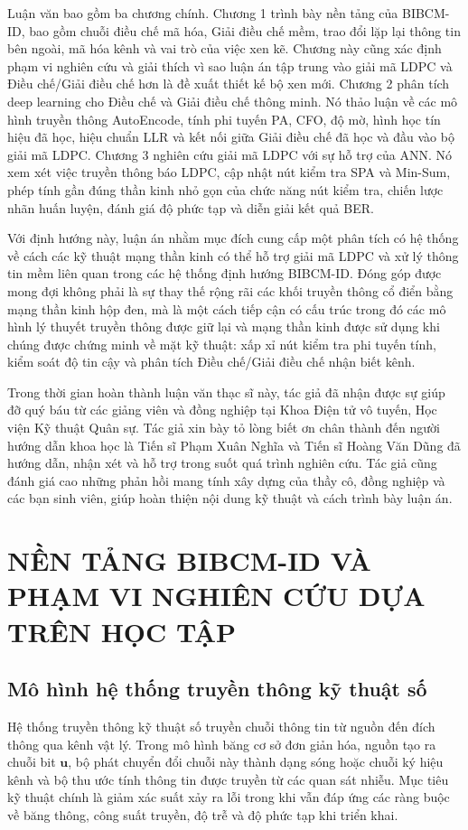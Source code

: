 Luận văn bao gồm ba chương chính. Chương 1 trình bày nền tảng của BIBCM-ID, bao gồm chuỗi điều chế mã hóa, Giải điều chế mềm, trao đổi lặp lại thông tin bên ngoài, mã hóa kênh và vai trò của việc xen kẽ. Chương này cũng xác định phạm vi nghiên cứu và giải thích vì sao luận án tập trung vào giải mã LDPC và Điều chế/Giải điều chế hơn là đề xuất thiết kế bộ xen mới. Chương 2 phân tích deep learning cho Điều chế và Giải điều chế thông minh. Nó thảo luận về các mô hình truyền thông AutoEncode, tính phi tuyến PA, CFO, độ mờ, hình học tín hiệu đã học, hiệu chuẩn LLR và kết nối giữa Giải điều chế đã học và đầu vào bộ giải mã LDPC. Chương 3 nghiên cứu giải mã LDPC với sự hỗ trợ của ANN. Nó xem xét việc truyền thông báo LDPC, cập nhật nút kiểm tra SPA và Min-Sum, phép tính gần đúng thần kinh nhỏ gọn của chức năng nút kiểm tra, chiến lược nhãn huấn luyện, đánh giá độ phức tạp và diễn giải kết quả BER.

Với định hướng này, luận án nhằm mục đích cung cấp một phân tích có hệ thống về cách các kỹ thuật mạng thần kinh có thể hỗ trợ giải mã LDPC và xử lý thông tin mềm liên quan trong các hệ thống định hướng BIBCM-ID. Đóng góp được mong đợi không phải là sự thay thế rộng rãi các khối truyền thông cổ điển bằng mạng thần kinh hộp đen, mà là một cách tiếp cận có cấu trúc trong đó các mô hình lý thuyết truyền thông được giữ lại và mạng thần kinh được sử dụng khi chúng được chứng minh về mặt kỹ thuật: xấp xỉ nút kiểm tra phi tuyến tính, kiểm soát độ tin cậy và phân tích Điều chế/Giải điều chế nhận biết kênh.

Trong thời gian hoàn thành luận văn thạc sĩ này, tác giả đã nhận được sự giúp đỡ quý báu từ các giảng viên và đồng nghiệp tại Khoa Điện tử vô tuyến, Học viện Kỹ thuật Quân sự. Tác giả xin bày tỏ lòng biết ơn chân thành đến người hướng dẫn khoa học là Tiến sĩ Phạm Xuân Nghĩa và Tiến sĩ Hoàng Văn Dũng đã hướng dẫn, nhận xét và hỗ trợ trong suốt quá trình nghiên cứu. Tác giả cũng đánh giá cao những phản hồi mang tính xây dựng của thầy cô, đồng nghiệp và các bạn sinh viên, giúp hoàn thiện nội dung kỹ thuật và cách trình bày luận án.

\chapter[\textbf{NỀN TẢNG BIBCM-ID VÀ PHẠM VI NGHIÊN CỨU}]{NỀN TẢNG BIBCM-ID VÀ PHẠM VI NGHIÊN CỨU DỰA TRÊN HỌC TẬP}
\section{Mô hình hệ thống truyền thông kỹ thuật số}
Hệ thống truyền thông kỹ thuật số truyền chuỗi thông tin từ nguồn đến đích thông qua kênh vật lý. Trong mô hình băng cơ sở đơn giản hóa, nguồn tạo ra chuỗi bit $\mathbf{u}$, bộ phát chuyển đổi chuỗi này thành dạng sóng hoặc chuỗi ký hiệu kênh và bộ thu ước tính thông tin được truyền từ các quan sát nhiễu. Mục tiêu kỹ thuật chính là giảm xác suất xảy ra lỗi trong khi vẫn đáp ứng các ràng buộc về băng thông, công suất truyền, độ trễ và độ phức tạp khi triển khai.

